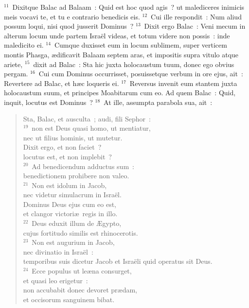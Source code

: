 ${}^{11}$~Dixitque Balac ad Balaam~: Quid est hoc quod agis~? ut malediceres inimicis meis vocavi te, et tu e contrario benedicis eis.
${}^{12}$~Cui ille respondit~: Num aliud possum loqui, nisi quod jusserit Dominus~?
${}^{13}$~Dixit ergo Balac~: Veni mecum in alterum locum unde partem Isra\"el videas, et totum videre non possis~: inde maledicito ei.
${}^{14}$~Cumque duxisset eum in locum sublimem, super verticem montis Phasga, \ae dificavit Balaam septem aras, et impositis supra vitulo atque ariete,
${}^{15}$~dixit ad Balac~: Sta hic juxta holocaustum tuum, donec ego obvius pergam.
${}^{16}$~Cui cum Dominus occurrisset, posuissetque verbum in ore ejus, ait~: Revertere ad Balac, et h\ae c loqueris ei.
${}^{17}$~Reversus invenit eum stantem juxta holocaustum suum, et principes Moabitarum cum eo. Ad quem Balac~: Quid, inquit, locutus est Dominus~?
${}^{18}$~At ille, assumpta parabola sua, ait~: \begin{flushleft}\begin{verse}Sta, Balac, et ausculta~; audi, fili Sephor~:\\
${}^{19}$~non est Deus quasi homo, ut mentiatur,\\ nec ut filius hominis, ut mutetur.\\ Dixit ergo, et non faciet~?\\ locutus est, et non implebit~?\\
${}^{20}$~Ad benedicendum adductus sum~:\\ benedictionem prohibere non valeo.\\
${}^{21}$~Non est idolum in Jacob,\\ nec videtur simulacrum in Isra\"el.\\ Dominus Deus ejus cum eo est,\\ et clangor victori\ae\ regis in illo.\\
${}^{22}$~Deus eduxit illum de \AE gypto,\\ cujus fortitudo similis est rhinocerotis.\\
${}^{23}$~Non est augurium in Jacob,\\ nec divinatio in Isra\"el~:\\ temporibus suis dicetur Jacob et Isra\"eli quid operatus sit Deus.\\
${}^{24}$~Ecce populus ut le\ae na consurget,\\ et quasi leo erigetur~:\\ non accubabit donec devoret pr\ae dam,\\ et occisorum sanguinem bibat.\end{verse}\end{flushleft}


